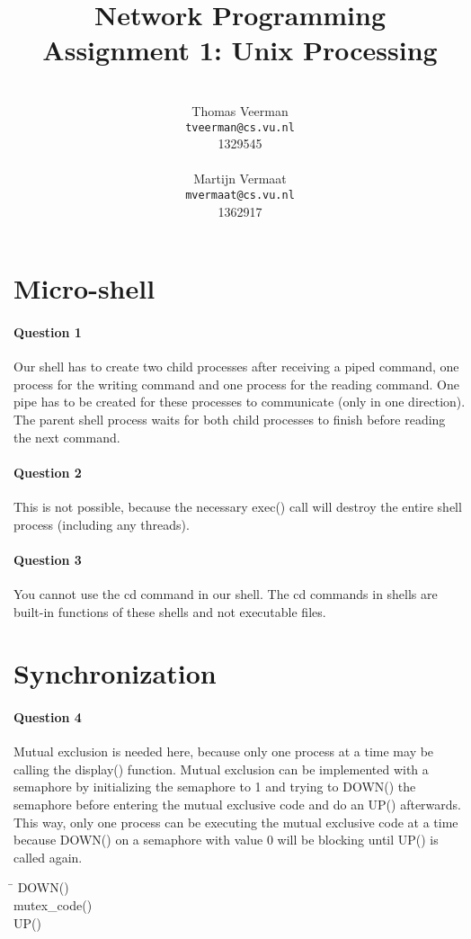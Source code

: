 \documentclass[a4paper,10pt]{article}
\title{Network Programming\\
\small{Assignment 1: Unix Processing}}
\author{%
        \mbox{}\\
	Thomas Veerman\\
	\texttt{tveerman@cs.vu.nl}\\
	1329545\\
	\mbox{}\\
	Martijn Vermaat\\
	\texttt{mvermaat@cs.vu.nl}\\
	1362917
}
\begin{document}
\maketitle

\section{Micro-shell}
\paragraph{Question 1}
Our shell has to create two child processes after receiving a piped command, one process for the writing command and one process for the reading command. One pipe has to be created for these processes to communicate (only in one direction). The parent shell process waits for both child processes to finish before reading the next command.

\paragraph{Question 2}
This is not possible, because the necessary exec() call will destroy the entire shell process (including any threads).

\paragraph{Question 3}
You cannot use the cd command in our shell. The cd commands in shells are built-in functions of these shells and not executable files.

\section{Synchronization}
\paragraph{Question 4}
Mutual exclusion is needed here, because only one process at a time may be calling the display() function. Mutual exclusion can be implemented with a semaphore by initializing the semaphore to 1 and trying to DOWN() the semaphore before entering the mutual exclusive code and do an UP() afterwards. This way, only one process can be executing the mutual exclusive code at a
time because DOWN() on a semaphore with value 0 will be blocking until UP() is called again.
\begin{tabbing}
\hspace{20pt}\=\kill
 \> DOWN()\\ 
 \> mutex\_code()\\ 
 \> UP() 
\end{tabbing}
\end{document}
